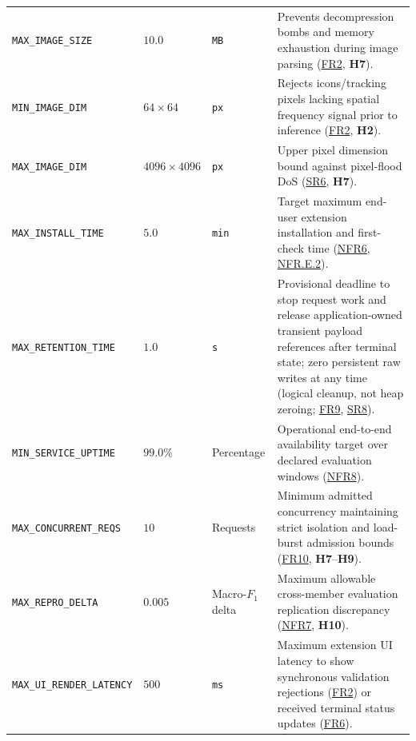 \documentclass[11pt]{article}
\begin{document}
{\begin{tabularx}{\textwidth}{P{4.4cm} P{1.7cm} P{1.8cm} Y}
\addlinespace
{}\label{const:MAX_IMAGE_SIZE}\texttt{MAX\_\allowbreak{}IMAGE\_\allowbreak{}SIZE} & $10.0$ & \texttt{MB} & Prevents decompression bombs and memory exhaustion during image parsing (\hyperref[FR2]{FR2}, \textbf{H7}).\\
\addlinespace
{}\label{const:MIN_IMAGE_DIM}\texttt{MIN\_\allowbreak{}IMAGE\_\allowbreak{}DIM} & $64 \times 64$ & \texttt{px} & Rejects icons/tracking pixels lacking spatial frequency signal prior to inference (\hyperref[FR2]{FR2}, \textbf{H2}).\\
\addlinespace
{}\label{const:MAX_IMAGE_DIM}\texttt{MAX\_\allowbreak{}IMAGE\_\allowbreak{}DIM} & $4096 \times 4096$ & \texttt{px} & Upper pixel dimension bound against pixel-flood DoS (\hyperref[SR6]{SR6}, \textbf{H7}).\\
\addlinespace
{}\label{const:MAX_INSTALL_TIME}\texttt{MAX\_\allowbreak{}INSTALL\_\allowbreak{}TIME} & $5.0$ & \texttt{min} & Target maximum end-user extension installation and first-check time (\hyperref[NFR6]{NFR6}, \hyperref[NFR.E.2]{NFR.E.2}).\\
\addlinespace
{}\label{const:MAX_RETENTION_TIME}\texttt{MAX\_\allowbreak{}RETENTION\_\allowbreak{}TIME} & $1.0$ & \texttt{s} & Provisional deadline to stop request work and release application-owned transient payload references after terminal state; zero persistent raw writes at any time (logical cleanup, not heap zeroing; \hyperref[FR9]{FR9}, \hyperref[SR8]{SR8}).\\
\addlinespace
{}\label{const:MIN_SERVICE_UPTIME}\texttt{MIN\_\allowbreak{}SERVICE\_\allowbreak{}UPTIME} & $99.0\%$ & Percentage & Operational end-to-end availability target over declared evaluation windows (\hyperref[NFR8]{NFR8}).\\
\addlinespace
{}\label{const:MAX_CONCURRENT_REQS}\texttt{MAX\_\allowbreak{}CONCURRENT\_\allowbreak{}REQS} & $10$ & Requests & Minimum admitted concurrency maintaining strict isolation and load-burst admission bounds (\hyperref[FR10]{FR10}, \textbf{H7}--\textbf{H9}).\\
\addlinespace
{}\label{const:MAX_REPRO_DELTA}\texttt{MAX\_\allowbreak{}REPRO\_\allowbreak{}DELTA} & $0.005$ & Macro-$F_1$ delta & Maximum allowable cross-member evaluation replication discrepancy (\hyperref[NFR7]{NFR7}, \textbf{H10}).\\
\addlinespace
{}\label{const:MAX_UI_RENDER_LATENCY}\texttt{MAX\_\allowbreak{}UI\_\allowbreak{}RENDER\_\allowbreak{}LATENCY} & $500$ & \texttt{ms} & Maximum extension UI latency to show synchronous validation rejections (\hyperref[FR2]{FR2}) or received terminal status updates (\hyperref[FR6]{FR6}).\\

\end{tabularx}}
\end{document}
